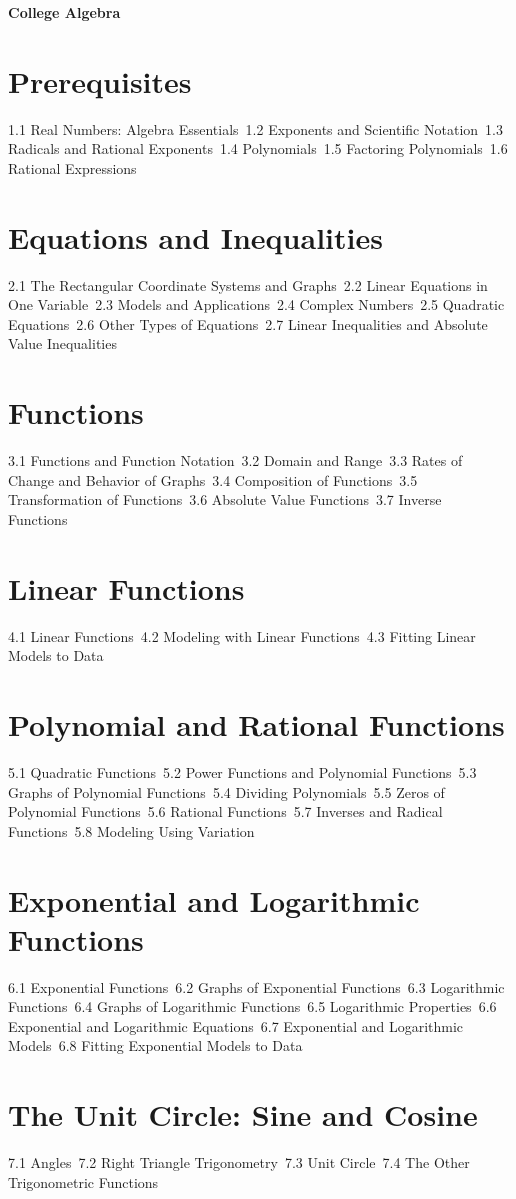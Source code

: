 {\LARGE \bf{College Algebra}}
\section{Prerequisites}
1.1 Real Numbers: Algebra Essentials\
1.2 Exponents and Scientific Notation\
1.3 Radicals and Rational Exponents\
1.4 Polynomials\
1.5 Factoring Polynomials\
1.6 Rational Expressions\
\section{Equations and Inequalities}
2.1 The Rectangular Coordinate Systems and Graphs\
2.2 Linear Equations in One Variable\
2.3 Models and Applications\
2.4 Complex Numbers\
2.5 Quadratic Equations\
2.6 Other Types of Equations\
2.7 Linear Inequalities and Absolute Value Inequalities\
\section{Functions}
3.1 Functions and Function Notation\
3.2 Domain and Range\
3.3 Rates of Change and Behavior of Graphs\
3.4 Composition of Functions\
3.5 Transformation of Functions\
3.6 Absolute Value Functions\
3.7 Inverse Functions\
\section{Linear Functions}
4.1 Linear Functions\
4.2 Modeling with Linear Functions\
4.3 Fitting Linear Models to Data\
\section{Polynomial and Rational Functions}
5.1 Quadratic Functions\
5.2 Power Functions and Polynomial Functions\
5.3 Graphs of Polynomial Functions\
5.4 Dividing Polynomials\
5.5 Zeros of Polynomial Functions\
5.6 Rational Functions\
5.7 Inverses and Radical Functions\
5.8 Modeling Using Variation\
\section{Exponential and Logarithmic Functions}
6.1 Exponential Functions\
6.2 Graphs of Exponential Functions\
6.3 Logarithmic Functions\
6.4 Graphs of Logarithmic Functions\
6.5 Logarithmic Properties\
6.6 Exponential and Logarithmic Equations\
6.7 Exponential and Logarithmic Models\
6.8 Fitting Exponential Models to Data\
\section{The Unit Circle: Sine and Cosine}
7.1 Angles\
7.2 Right Triangle Trigonometry\
7.3 Unit Circle\
7.4 The Other Trigonometric Functions\
